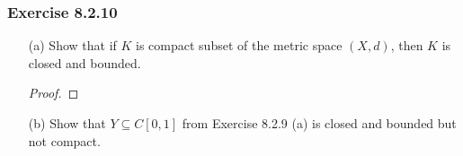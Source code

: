 \subsubsection{Exercise 8.2.10} 
\begin{enumerate}
    \item[(a)] Show that if \( K  \) is compact subset of the metric space \( (X,d)  \), then \( K  \) is closed and bounded.       
        \begin{proof}
        
        \end{proof}
    \item[(b)] Show that \( Y \subseteq C[0,1]  \) from Exercise 8.2.9 (a) is closed and bounded but not compact.
\end{enumerate}





